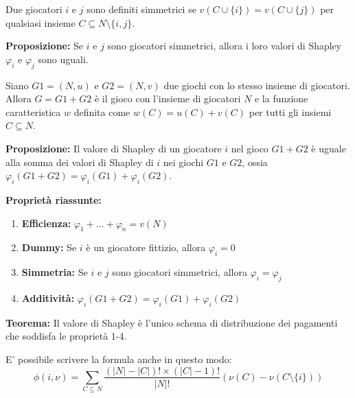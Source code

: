 \begin{definition}[Proprietà 3]

    Due giocatori $i$ e $j$ sono definiti simmetrici se $v(C \cup \{i\}) = v(C \cup
        \{j\})$ per qualsiasi insieme $C \subseteq N \setminus \{i, j\}$.

    \textbf{Proposizione:} Se $i$ e $j$ sono giocatori simmetrici, allora i loro valori di Shapley $\varphi_i$ e $\varphi_j$ sono uguali.

\end{definition}

\begin{definition}[Proprietà 4]

    Siano $G1 = (N, u)$ e $G2 = (N, v)$ due giochi con lo stesso insieme di
    giocatori. Allora $G = G1 + G2$ è il gioco con l'insieme di giocatori $N$ e la
    funzione caratteristica $w$ definita come $w(C) = u(C) + v(C)$ per tutti gli
    insiemi $C \subseteq N$.

    \textbf{Proposizione:} Il valore di Shapley di un giocatore $i$ nel gioco $G1 + G2$ è uguale alla somma dei valori di Shapley di $i$ nei giochi $G1$ e $G2$, ossia $\varphi_i(G1 + G2) = \varphi_i(G1) + \varphi_i(G2)$.

\end{definition}

\textbf{Proprietà riassunte:}
\begin{enumerate}
    \item \textbf{Efficienza:} $\varphi_1 + \ldots + \varphi_n = v(N)$
    \item \textbf{Dummy:} Se $i$ è un giocatore fittizio, allora $\varphi_i = 0$
    \item \textbf{Simmetria:} Se $i$ e $j$ sono giocatori simmetrici, allora $\varphi_i = \varphi_j$
    \item \textbf{Additività:} $\varphi_i(G1+G2) = \varphi_i(G1) + \varphi_i(G2)$
\end{enumerate}

\textbf{Teorema:} Il valore di Shapley è l'unico schema di distribuzione dei pagamenti che soddisfa le proprietà 1-4.

E' possibile scrivere la formula anche in questo modo:
\[
    \phi(i, \nu) = \sum_{C \subseteq N} \frac{(|N|-|C|)! \times (|C| -1)!}{|N|!}(\nu(C) - \nu(C\setminus \{i\}))
\]
